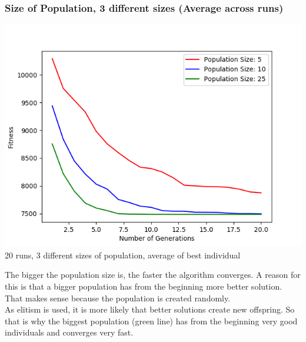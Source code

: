 \documentclass[10pt,a4paper]{article}
\begin{document}
	\subsubsection{Size of Population, 3 different sizes (Average across runs)}
	\begin{center}
		\includegraphics[width=1\linewidth]{pictures/geneticAlgorithm/genetic_all_in_one}
		\\
		20 runs, 3 different sizes of population, average of best individual
		\\
	\end{center}
	The bigger the population size is, the faster the algorithm converges. A reason for this is that a bigger population has from the beginning more better solution. That makes sense because the population is created randomly.\\
	As elitism is used, it is more likely that better solutions create new offspring. So that is why the biggest population (green line) has from the beginning very good individuals and converges very fast.
	
\end{document}
